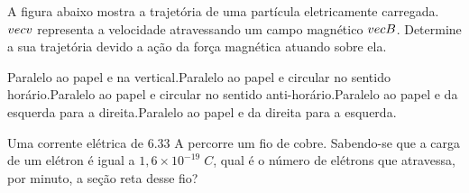 \documentclass[12pt, addpoints]{exam}
\begin{document}
        \begin{questions}
\begin{multicols*}{2}
\question[20] A ﬁgura abaixo mostra a trajetória de uma partícula eletricamente carregada. $\\vec{{v}}$ representa a velocidade atravessando um campo magnético $\\vec{{B}}$. Determine a sua trajetória devido a ação da força magnética atuando sobre ela.
        
        \begin{center}
            \begin{minipage}[c]{0.5\linewidth}
            \end{minipage}
        \end{center}

        

\begin{choices}
\choice Paralelo ao papel e na vertical.\choice Paralelo ao papel e circular no sentido horário.\choice Paralelo ao papel e circular no sentido anti-horário.\choice Paralelo ao papel e da esquerda para a direita.\choice Paralelo ao papel e da direita para a esquerda.\end{choices}
\question[20] Uma corrente elétrica de    6.33 A percorre um ﬁo de cobre. Sabendo-se que a carga de um elétron é igual a $1,6\times 10^{-19}\;C$, qual é o número de elétrons que atravessa, por minuto, a seção reta desse ﬁo?


\end{multicols*}
\end{questions}
\end{document}
